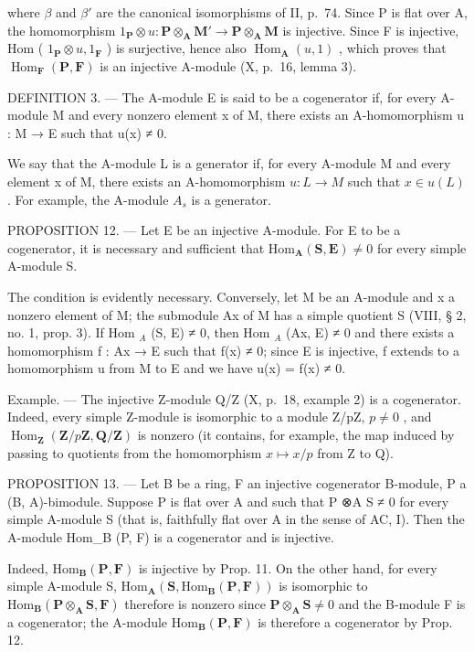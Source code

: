 where \(\beta\) and \(\beta'\) are the canonical isomorphisms of II, p.~74. Since P is flat over A, the homomorphism \(1_{\mathbf{P}} \otimes u: \mathbf{P} \otimes_{\mathbf{A}} \mathbf{M}' \to \mathbf{P} \otimes_{\mathbf{A}} \mathbf{M}\) is injective. Since F is injective, Hom ( \(1_{\mathbf{P}} \otimes u, 1_{\mathbf{F}}\) ) is surjective, hence also \(\operatorname{Hom}_{\mathbf{A}}(u, 1)\) , which proves that \(\operatorname{Hom}_{\mathbf{F}}(\mathbf{P}, \mathbf{F})\) is an injective A-module (X, p.~16, lemma 3).

DEFINITION 3. --- The A-module E is said to be a cogenerator if, for every A-module M and every nonzero element x of M, there exists an A-homomorphism u : M → E such that u(x) ≠ 0.

We say that the A-module L is a generator if, for every A-module M and every element x of M, there exists an A-homomorphism \(u : L \to M\) such that \(x \in u(L)\) . For example, the A-module \(A_{s}\) is a generator.

PROPOSITION 12. --- Let E be an injective A-module. For E to be a cogenerator, it is necessary and sufficient that \(\mathrm{Hom}_{\mathbf{A}}(\mathbf{S},\mathbf{E})\neq 0\) for every simple A-module S.

The condition is evidently necessary. Conversely, let M be an A-module and x a nonzero element of M; the submodule Ax of M has a simple quotient S (VIII, § 2, no. 1, prop. 3). If Hom \(_{A}\) (S, E) ≠ 0, then Hom \(_{A}\) (Ax, E) ≠ 0 and there exists a homomorphism f : Ax → E such that f(x) ≠ 0; since E is injective, f extends to a homomorphism u from M to E and we have u(x) = f(x) ≠ 0.

Example. --- The injective Z-module Q/Z (X, p.~18, example 2) is a cogenerator. Indeed, every simple Z-module is isomorphic to a module Z/pZ, \(p \neq 0\) , and \(\operatorname{Hom}_{\mathbf{Z}}(\mathbf{Z}/p\mathbf{Z}, \mathbf{Q}/\mathbf{Z})\) is nonzero (it contains, for example, the map induced by passing to quotients from the homomorphism \(x \mapsto x/p\) from Z to Q).

PROPOSITION 13. --- Let B be a ring, F an injective cogenerator B-module, P a (B, A)-bimodule. Suppose P is flat over A and such that P ⊗A S ≠ 0 for every simple A-module S (that is, faithfully flat over A in the sense of AC, I). Then the A-module Hom\_B (P, F) is a cogenerator and is injective.

Indeed, \(\mathrm{Hom}_{\mathbf{B}}(\mathbf{P},\mathbf{F})\) is injective by Prop. 11. On the other hand, for every simple A-module S, \(\mathrm{Hom}_{\mathbf{A}}(\mathbf{S},\mathrm{Hom}_{\mathbf{B}}(\mathbf{P},\mathbf{F}))\) is isomorphic to \(\mathrm{Hom}_{\mathbf{B}}(\mathbf{P}\otimes_{\mathbf{A}}\mathbf{S},\mathbf{F})\) therefore is nonzero since \(\mathbf{P}\otimes_{\mathbf{A}}\mathbf{S}\neq 0\) and the B-module F is a cogenerator; the A-module \(\mathrm{Hom}_{\mathbf{B}}(\mathbf{P},\mathbf{F})\) is therefore a cogenerator by Prop. 12.

